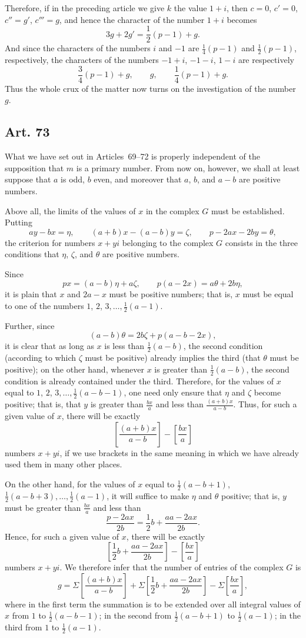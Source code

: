 \documentclass[12pt]{article}
\newcommand{\art}[1]{\subsection*{Art. #1}}
\newcommand{\gbrack}[1]{\left[#1\right]}
\begin{document}
Therefore, if in the preceding article we give $k$ the value $1+i$, then $c=0$, $c'=0$, $c''=g'$, $c'''=g$, and hence the character of the number $1+i$ becomes
\[
3g+2g'=\frac12(p-1)+g.
\]
And since the characters of the numbers $i$ and $-1$ are $\frac14(p-1)$ and $\frac12(p-1)$, respectively, the characters of the numbers $-1+i$, $-1-i$, $1-i$ are respectively
\[
\frac34(p-1)+g,\qquad g,\qquad \frac14(p-1)+g.
\]
Thus the whole crux of the matter now turns on the investigation of the number $g$.

\art{73}
What we have set out in Articles~69--72 is properly independent of the supposition that $m$ is a primary number. From now on, however, we shall at least suppose that $a$ is odd, $b$ even, and moreover that $a$, $b$, and $a-b$ are positive numbers.

Above all, the limits of the values of $x$ in the complex $G$ must be established. Putting
\[
ay-bx=\eta,\qquad (a+b)x-(a-b)y=\zeta,\qquad p-2ax-2by=\theta,
\]
the criterion for numbers $x+yi$ belonging to the complex $G$ consists in the three conditions that $\eta$, $\zeta$, and $\theta$ are positive numbers.

Since
\[
px=(a-b)\eta+a\zeta,\qquad p(a-2x)=a\theta+2b\eta,
\]
it is plain that $x$ and $2a-x$ must be positive numbers; that is, $x$ must be equal to one of the numbers $1$, $2$, $3,\ldots,\frac12(a-1)$.

Further, since
\[
(a-b)\theta=2b\zeta+p(a-b-2x),
\]
it is clear that as long as $x$ is less than $\frac12(a-b)$, the second condition (according to which $\zeta$ must be positive) already implies the third (that $\theta$ must be positive); on the other hand, whenever $x$ is greater than $\frac12(a-b)$, the second condition is already contained under the third. Therefore, for the values of $x$ equal to $1$, $2$, $3,\ldots,\frac12(a-b-1)$, one need only ensure that $\eta$ and $\zeta$ become positive; that is, that $y$ is greater than $\frac{bx}{a}$ and less than $\frac{(a+b)x}{a-b}$. Thus, for such a given value of $x$, there will be exactly
\[
\gbrack{\frac{(a+b)x}{a-b}}-\gbrack{\frac{bx}{a}}
\]
numbers $x+yi$, if we use brackets in the same meaning in which we have already used them in many other places.

On the other hand, for the values of $x$ equal to $\frac12(a-b+1)$, $\frac12(a-b+3),\ldots,\frac12(a-1)$, it will suffice to make $\eta$ and $\theta$ positive; that is, $y$ must be greater than $\frac{bx}{a}$ and less than
\[
\frac{p-2ax}{2b}=\frac12b+\frac{aa-2ax}{2b}.
\]
Hence, for such a given value of $x$, there will be exactly
\[
\gbrack{\frac12b+\frac{aa-2ax}{2b}}-\gbrack{\frac{bx}{a}}
\]
numbers $x+yi$. We therefore infer that the number of entries of the complex $G$ is
\[
g=\Sigma\gbrack{\frac{(a+b)x}{a-b}}
 +\Sigma\gbrack{\frac12b+\frac{aa-2ax}{2b}}
 -\Sigma\gbrack{\frac{bx}{a}},
\]
where in the first term the summation is to be extended over all integral values of $x$ from $1$ to $\frac12(a-b-1)$; in the second from $\frac12(a-b+1)$ to $\frac12(a-1)$; in the third from $1$ to $\frac12(a-1)$.
\end{document}
